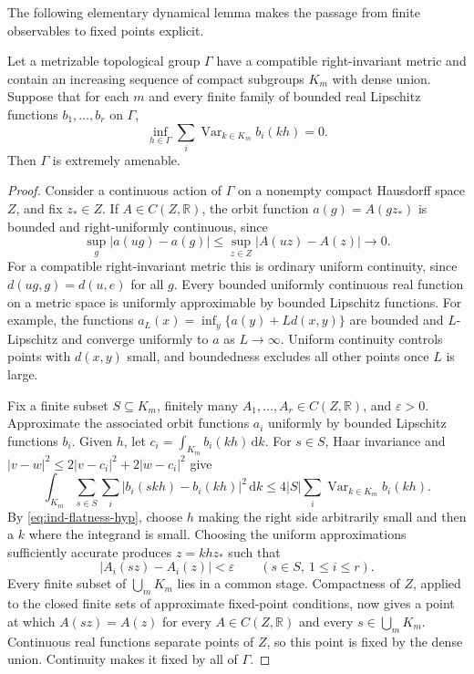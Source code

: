 The following elementary dynamical lemma makes the passage from
finite observables to fixed points explicit.

\begin{lemma}\label{lem:ind-variance-to-fixed}
Let a metrizable topological group $\Gamma$ have a compatible right-invariant
metric and contain an increasing sequence of compact subgroups $K_m$
with dense union. Suppose that for each $m$ and every finite family
of bounded real Lipschitz functions $b_1,\ldots,b_r$ on $\Gamma$,
\begin{equation}\label{eq:ind-flatness-hyp}
\inf_{h\in\Gamma}\sum_i\operatorname{Var}_{k\in K_m}b_i(kh)=0.
\end{equation}
Then $\Gamma$ is extremely amenable.
\end{lemma}

\begin{proof}
Consider a continuous action of $\Gamma$ on a nonempty compact Hausdorff
space $Z$, and fix $z_*\in Z$. If $A\in C(Z,\mathbb R)$, the orbit
function $a(g)=A(gz_*)$ is bounded and right-uniformly continuous,
since
\[
\sup_g\lvert a(ug)-a(g)\rvert\le
\sup_{z\in Z}\lvert A(uz)-A(z)\rvert\longrightarrow0.
\]
For a compatible right-invariant metric this is ordinary uniform
continuity, since $d(ug,g)=d(u,e)$ for all $g$. Every bounded uniformly continuous real function on a
metric space is uniformly approximable by bounded Lipschitz
functions. For example, the functions
$a_L(x)=\inf_y\{a(y)+L d(x,y)\}$ are bounded and $L$-Lipschitz
and converge uniformly to $a$ as $L\to\infty$. Uniform continuity
controls points with $d(x,y)$ small, and boundedness excludes all
other points once $L$ is large.

Fix a finite subset $S\subseteq K_m$, finitely many
$A_1,\ldots,A_r\in C(Z,\mathbb R)$, and $\varepsilon>0$. Approximate the
associated orbit functions $a_i$ uniformly by bounded Lipschitz
functions $b_i$. Given $h$, let $c_i=\int_{K_m}b_i(kh)\,\mathrm d k$.
For $s\in S$, Haar invariance and $\lvert v-w\rvert^2\le
2\lvert v-c_i\rvert^2+2\lvert w-c_i\rvert^2$ give
\[
\int_{K_m}\sum_{s\in S}\sum_i
\lvert b_i(skh)-b_i(kh)\rvert^2\,\mathrm d k
\le4\lvert S\rvert\sum_i\operatorname{Var}_{k\in K_m}b_i(kh).
\]
By \eqref{eq:ind-flatness-hyp}, choose $h$ making the right side
arbitrarily small and then a $k$ where the integrand is small.
Choosing the uniform approximations sufficiently accurate produces
$z=khz_*$ such that
\[
\lvert A_i(sz)-A_i(z)\rvert<\varepsilon\qquad(s\in S,\ 1\le i\le r).
\]
Every finite subset of $\bigcup_mK_m$ lies in a common stage.
Compactness of $Z$, applied to the closed finite sets of approximate
fixed-point conditions, now gives a point at which
$A(sz)=A(z)$ for every $A\in C(Z,\mathbb R)$ and every
$s\in\bigcup_mK_m$. Continuous real functions separate points of
$Z$, so this point is fixed by the dense union. Continuity makes it
fixed by all of $\Gamma$.
\end{proof}

